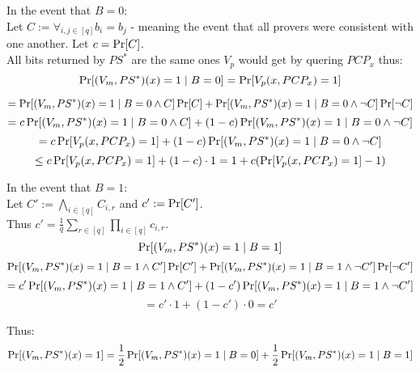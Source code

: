 \begin{itemize}
		In the event that $B=0$:\\
		Let $C:= \forall_{i,j\in [q]}b_i=b_j$ - meaning the event that
		all provers were consistent with one another. Let $c=\operatorname*{Pr}[C]$.\\

		All bits returned by $PS^*$ are the same ones $V_p$ would
		get by quering $PCP_x$ thus:
		\[
			\operatorname*{Pr}[(V_m,PS^*)(x)=1\mid B=0]	
			=\operatorname*{Pr}[V_p(x, PCP_x)=1]
		\]
		
		\[
			=\operatorname*{Pr}[(V_m,PS^*)(x)=1\mid B=0\wedge C]\operatorname*{Pr}[C]
			+\operatorname*{Pr}[(V_m,PS^*)(x)=1\mid B=0\wedge \neg C]\operatorname*{Pr}[\neg C]
		\]
		\[
			=c\operatorname*{Pr}[(V_m,PS^*)(x)=1\mid B=0\wedge C]
			+(1-c)\operatorname*{Pr}[(V_m,PS^*)(x)=1\mid B=0\wedge \neg C]
		\]
		\[
			=c\operatorname*{Pr}[V_p(x, PCP_x)=1]
			+(1-c)\operatorname*{Pr}[(V_m,PS^*)(x)=1\mid B=0\wedge \neg C]
		\]
		\[
			\leq c\operatorname*{Pr}[V_p(x, PCP_x)=1]+(1-c)\cdot 1
			=1+c(\operatorname*{Pr}[V_p(x, PCP_x)=1]-1)
		\]

		In the event that $B=1$:\\
		Let $C':=\bigwedge_{i\in[q]}C_{i,r}$ and $c':=\operatorname*{Pr}[C']$.\\
		Thus $c'=\frac{1}{q}\sum_{r\in[q]}\prod_{i\in[q]}c_{i,r}$.\\
		\[
			\operatorname*{Pr}[(V_m,PS^*)(x)=1\mid B=1]
		\]
		\[
			\operatorname*{Pr}[(V_m,PS^*)(x)=1\mid B=1\wedge C']\operatorname*{Pr}[C']
			+\operatorname*{Pr}[(V_m,PS^*)(x)=1\mid B=1\wedge \neg C']\operatorname*{Pr}[\neg C']
		\]
		\[
			=c'\operatorname*{Pr}[(V_m,PS^*)(x)=1\mid B=1\wedge C']
			+(1-c')\operatorname*{Pr}[(V_m,PS^*)(x)=1\mid B=1\wedge \neg C']
		\]
		\[
			=c'\cdot 1+(1-c')\cdot 0=c'
		\]

		Thus:
		\[
			\operatorname*{Pr}[(V_m,PS^*)(x)=1]
			=\frac{1}{2}\operatorname*{Pr}[(V_m,PS^*)(x)=1\mid B=0]+\frac{1}{2}\operatorname*{Pr}[(V_m,PS^*)(x)=1\mid B=1]
		\]
\end{itemize}